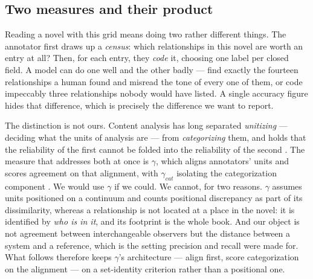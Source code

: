 \subsection{Two measures and their product}

Reading a novel with this grid means doing two rather different things. The
annotator first draws up a \emph{census}: which relationships in this novel are
worth an entry at all? Then, for each entry, they \emph{code} it, choosing one
label per closed field. A model can do one well and the other badly --- find
exactly the fourteen relationships a human found and misread the tone of every
one of them, or code impeccably three relationships nobody would have listed. A
single accuracy figure hides that difference, which is precisely the difference
we want to report.

The distinction is not ours. Content analysis has long separated
\emph{unitizing} --- deciding what the units of analysis are --- from
\emph{categorizing} them, and holds that the reliability of the first cannot be
folded into the reliability of the second
\cite{krippendorff2013content,krippendorff2016unitizing}. The measure that
addresses both at once is $\gamma$, which aligns annotators' units and scores
agreement on that alignment, with $\gamma_{cat}$ isolating the categorization
component \cite{mathet2015gamma,mathet2017gammacat}. We would use $\gamma$ if we
could. We cannot, for two reasons. $\gamma$ assumes units positioned on a
continuum and counts positional discrepancy as part of its dissimilarity,
whereas a relationship is not located at a place in the novel: it is identified
by \emph{who is in it}, and its footprint is the whole book. And our object is
not agreement between interchangeable observers but the distance between a
system and a reference, which is the setting precision and recall were made for.
What follows therefore keeps $\gamma$'s architecture --- align first, score
categorization on the alignment --- on a set-identity criterion rather than a
positional one.

